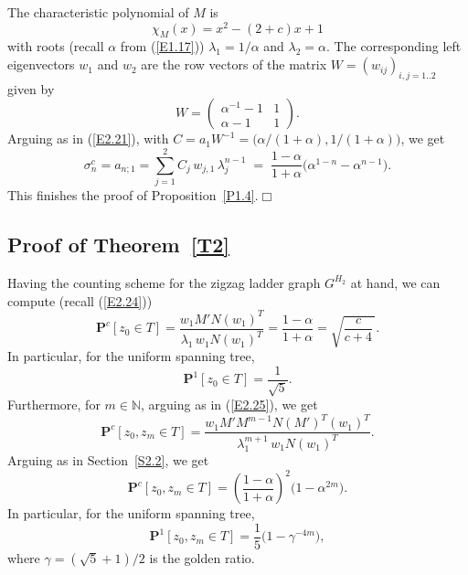 \documentclass[11pt]{article}
\providecommand{\1}{\mathBB{1}}
\renewcommand{\P}{\mathbf{P}}
\newcommand{\N}{{\mathbb{N}}}
\newcommand{\equ}[1]{(\ref{#1})}
\providecommand{\eop}{{}\hfill {}\hfill{$\Box
$}\vspace{0.3cm}\pagebreak[2]\par}
\begin{document}
The characteristic polynomial of $M$ is
$$\chi_M(x)=x^2-(2+c)x+1$$
with roots (recall $\alpha$ from \equ{E1.17})
$\lambda_1=1/\alpha$ and $\lambda_2=\alpha$.
The corresponding left eigenvectors $w_1$ and $w_2$ are the row vectors of the matrix $W=(w_{ij})_{i,j=1..2}$ given by
\begin{equation}
\label{E3.07}
W=\left(\begin{array}{cc}
\alpha^{-1}-1&1\\
\alpha-1&1
\end{array}\right).
\end{equation}
Arguing as in \equ{E2.21}, with $C=a_1W^{-1}=\big(\alpha/(1+\alpha),1/(1+\alpha)\big)$, we get
\begin{equation}
\label{E3.08}
\sigma^c_n=a_{n;1}=\sum_{j=1}^2C_j\,w_{j,1}\,\lambda_j^{n-1}
\;=\;\frac{1-\alpha}{1+\alpha}\big(\alpha^{1-n}-\alpha^{n-1}\big).
\end{equation}
This finishes the proof of Proposition~\ref{P1.4}.\eop


\subsection{Proof of Theorem~\ref{T2}}
\label{S3.2}
Having the counting scheme for the zigzag ladder graph $G^{H_2}$ at hand, we can compute (recall \equ{E2.24})
\begin{equation}
\label{E3.09}
\P^c[z_0\in T]=\frac{w_1M'N(w_1)^T}{\lambda_1\,w_1N(w_1)^T}=\frac{1-\alpha}{1+\alpha}=\sqrt{\frac{c}{c+4}\,}.
\end{equation}
In particular, for the uniform spanning tree,
\begin{equation}
\label{E3.10}
\P^1[z_0\in T]=\frac{1}{\sqrt{5}}.
\end{equation}
Furthermore, for $m\in\N$, arguing as in \equ{E2.25}, we get
\begin{equation}
\label{E3.11}
\P^c[z_0,z_m\in T]=\frac{w_1M'M^{m-1}N(M')^T(w_1)^T}{\lambda_1^{m+1}\,w_1N(w_1)^T}.
\end{equation}
Arguing as in Section~\ref{S2.2}, we get
\begin{equation}
\label{E3.12}
\P^c[z_0,z_m\in T]=\left(\frac{1-\alpha}{1+\alpha}\right)^2\big(1-\alpha^{2m}\big).
\end{equation}
In particular, for the uniform spanning tree,
\begin{equation}
\label{E3.13}
\P^1[z_0,z_m\in T]=\frac15\big(1-\gamma^{-4m}\big),
\end{equation}
where $\gamma=(\sqrt{5}+1)/2$ is the golden ratio.
\end{document}

